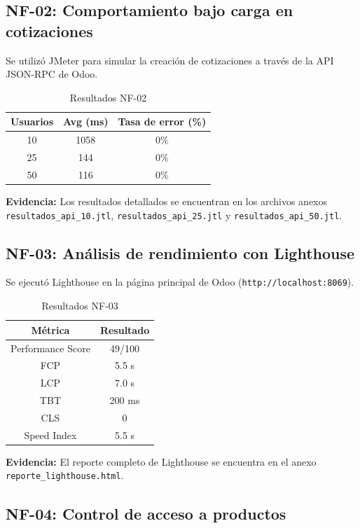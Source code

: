 \documentclass[12pt, letterpaper]{article}
\begin{document}
\subsection{NF-02: Comportamiento bajo carga en cotizaciones}

Se utilizó JMeter para simular la creación de cotizaciones a través de la API JSON-RPC de Odoo.

\begin{table}[H]
\centering
\caption{Resultados NF-02}
\begin{tabular}{|c|c|c|}
\hline
\textbf{Usuarios} & \textbf{Avg (ms)} & \textbf{Tasa de error (\%)} \\
\hline
10 & 1058 & 0\% \\
25 & 144 & 0\% \\
50 & 116 & 0\% \\
\hline
\end{tabular}
\end{table}

\textbf{Evidencia:} Los resultados detallados se encuentran en los archivos anexos \texttt{resultados\_api\_10.jtl}, \texttt{resultados\_api\_25.jtl} y \texttt{resultados\_api\_50.jtl}.

\subsection{NF-03: Análisis de rendimiento con Lighthouse}

Se ejecutó Lighthouse en la página principal de Odoo (\texttt{http://localhost:8069}).

\begin{table}[H]
\centering
\caption{Resultados NF-03}
\begin{tabular}{|c|c|}
\hline
\textbf{Métrica} & \textbf{Resultado} \\
\hline
Performance Score & 49/100 \\
FCP & 5.5 s \\
LCP & 7.0 s \\
TBT & 200 ms \\
CLS & 0 \\
Speed Index & 5.5 s \\
\hline
\end{tabular}
\end{table}

\textbf{Evidencia:} El reporte completo de Lighthouse se encuentra en el anexo \texttt{reporte\_lighthouse.html}.

\subsection{NF-04: Control de acceso a productos}
\end{document}
